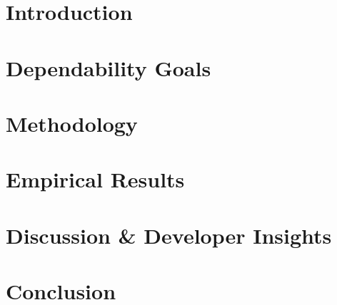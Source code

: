 \documentclass[sigconf]{acmart}
\begin{document}
    \maketitle

    \section{Introduction}
    \label{sec:introduction}
    

    \section{Dependability Goals}
    \label{sec:goals}
    

    \section{Methodology}
    \label{sec:methodology}
    

    \section{Empirical Results}
    \label{sec:results}
    

    \section{Discussion \& Developer Insights}
    \label{sec:discussion}
    

    \section{Conclusion}
    \label{sec:conclusion}
    

    
    
\end{document}
